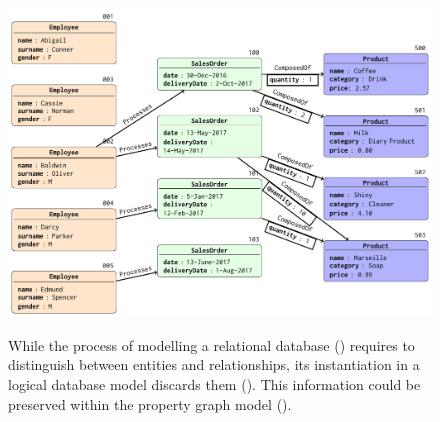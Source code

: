 \begin{figure}[!pth]
	\begin{minipage}[b]{\textwidth}
		\centering
		\includegraphics[scale=.6]{fig/02models/03dbasgraph}
		\label{fig:graphofdb1}
	\end{minipage}
	\caption{While the process of modelling a relational database () requires to distinguish between entities and relationships, its instantiation in a logical database model discards them (). This information could be preserved within the property graph model (). }
	\label{fig:relationalinstance}
\end{figure}

